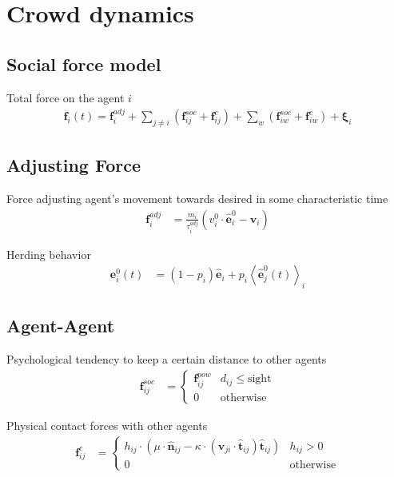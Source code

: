 \section{Crowd dynamics}
\subsection{Social force model}
Total force on the agent $ i $
\begin{align}
\mathbf{f}_{i}(t) = \mathbf{f}_{i}^{adj} + \sum_{j\neq i}^{} \left(\mathbf{f}_{ij}^{soc} + \mathbf{f}_{ij}^{c}\right) + \sum_{w}^{} \left(\mathbf{f}_{iw}^{soc} + \mathbf{f}_{iw}^{c}\right) + \boldsymbol{\xi}_{i}
\end{align}


\subsection{Adjusting Force}
Force adjusting agent's movement towards desired in some characteristic time \begin{align}
\mathbf{f}_{i}^{adj} &= \frac{m_{i}}{\tau_{i}^{adj}} (v_{i}^{0} \cdot \hat{\mathbf{e}}_{i}^{0} - \mathbf{v}_{i}) 
\end{align}

Herding behavior
\begin{align}
\mathbf{e}_{i}^{0}(t) &= (1 - p_{i}) \hat{\mathbf{e}}_{i} + p_{i} \left\langle \hat{\mathbf{e}}_{j}^{0}(t) \right\rangle_{i}
\end{align}


\subsection{Agent-Agent}
Psychological tendency to keep a certain distance to other agents
\begin{align}
\mathbf{f}_{ij}^{soc} &=
\begin{cases}
\mathbf{f}_{ij}^{pow} &  d_{ij} \leq \text{sight} \\
0 & \text{otherwise}
\end{cases}
\end{align}

Physical contact forces with other agents 
\begin{align}
\mathbf{f}_{ij}^{c} &= 
\begin{cases}
h_{ij} \cdot \left(\mu \cdot \hat{\mathbf{n}}_{ij} - \kappa \cdot \left(\mathbf{v}_{ji} \cdot \hat{\mathbf{t}}_{ij}\right) \hat{\mathbf{t}}_{ij}\right) & h_{ij} > 0 \\
0 & \text{otherwise}
\end{cases}
\end{align}


